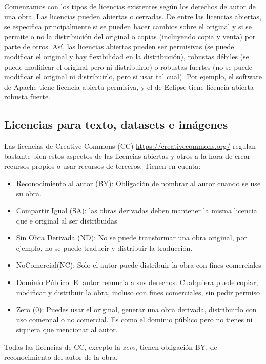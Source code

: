 \begin{naranja}
Comenzamos con los tipos de licencias existentes según los derechos de autor de una obra. Las licencias pueden abiertas o cerradas. De entre las licencias abiertas, se especifica principalmente si se pueden hacer cambios sobre el original y si se permite o no la distribución del original o copias (incluyendo copia y venta) por parte de otros. Así, las licencias abiertas pueden ser permisivas (se puede modificar el original y hay flexibilidad en la distribución), robustas débiles (se puede modificar el original pero ni distribuirlo) o robustas fuertes (no se puede modificar el original ni distribuirlo, pero si usar tal cual). Por ejemplo, el software de Apache tiene licencia abierta permisiva, y el de Eclipse tiene licencia abierta robusta fuerte.

\subsection{Licencias para texto, datasets e imágenes}

Las licencias de Creative Commons (CC) \url{https://creativecommons.org/} regulan bastante bien estos aspectos de las licencias abiertas y otros a la hora de crear recursos propios o usar recursos de terceros. Tienen en cuenta:
\begin{itemize}
    \item Reconocimiento al autor (BY): Obligación de nombrar al autor cuando se use su obra.
    \item Compartir Igual (SA): las obras derivadas deben mantener la misma licencia que e original al ser distribuidas
    \item Sin Obra Derivada (ND): No se puede transformar una obra original, por ejemplo, no se puede traducir y distribuir la traducción.
    \item NoComercial(NC): Solo el autor puede distribuir la obra con fines comerciales
    \item Dominio Público: El autor renuncia a sus derechos. Cualquiera puede copiar, modificar y distribuir la obra, incluso con fines comerciales, sin pedir permiso
    \item Zero (0): Puedes usar el original, generar una obra derivada, distribuirlo con uso comercial o no comercial. Es como el dominio público pero no tienes ni siquiera que mencionar al autor.
\end{itemize}

Todas las licencias de CC, excepto la \textit{zero}, tienen obligación BY, de reconocimiento del autor de la obra.


\end{naranja}
